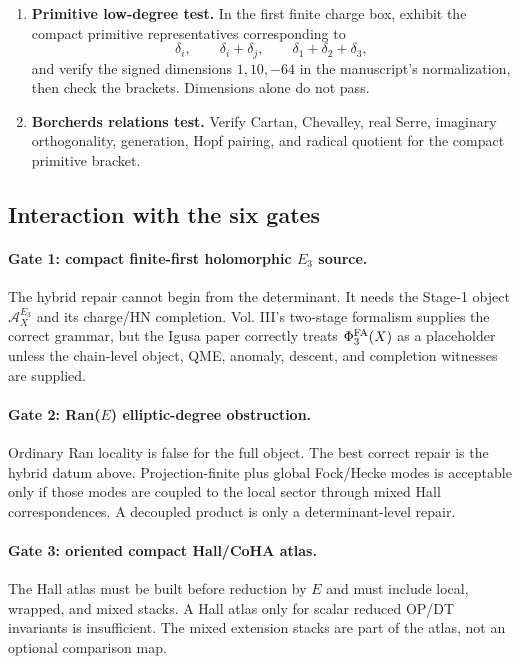 \begin{enumerate}
\item \textbf{Primitive low-degree test.}  In the first finite charge
box, exhibit the compact primitive representatives corresponding to
\[
\delta_i,\qquad \delta_i+\delta_j,\qquad
\delta_1+\delta_2+\delta_3,
\]
and verify the signed dimensions \(1,10,-64\) in the manuscript's
normalization, then check the brackets.  Dimensions alone do not pass.

\item \textbf{Borcherds relations test.}  Verify Cartan, Chevalley, real
Serre, imaginary orthogonality, generation, Hopf pairing, and radical
quotient for the compact primitive bracket.
\end{enumerate}

\subsection{Interaction with the six gates}

\paragraph{Gate 1: compact finite-first holomorphic \(E_3\) source.}
The hybrid repair cannot begin from the determinant.  It needs the
Stage-1 object \(\mathcal A_X^{E_3}\) and its charge/HN completion.
Vol. III's two-stage formalism supplies the correct grammar, but the
Igusa paper correctly treats \(\Phi^{\mathrm{FA}}_3(X)\) as a placeholder unless the
chain-level object, QME, anomaly, descent, and completion witnesses are
supplied.

\paragraph{Gate 2: Ran(\(E\)) elliptic-degree obstruction.}
Ordinary Ran locality is false for the full object.  The best correct
repair is the hybrid datum above.  Projection-finite plus global
Fock/Hecke modes is acceptable only if those modes are coupled to the
local sector through mixed Hall correspondences.  A decoupled product is
only a determinant-level repair.

\paragraph{Gate 3: oriented compact Hall/CoHA atlas.}
The Hall atlas must be built before reduction by \(E\) and must include
local, wrapped, and mixed stacks.  A Hall atlas only for scalar reduced
OP/DT invariants is insufficient.  The mixed extension stacks are part
of the atlas, not an optional comparison map.

